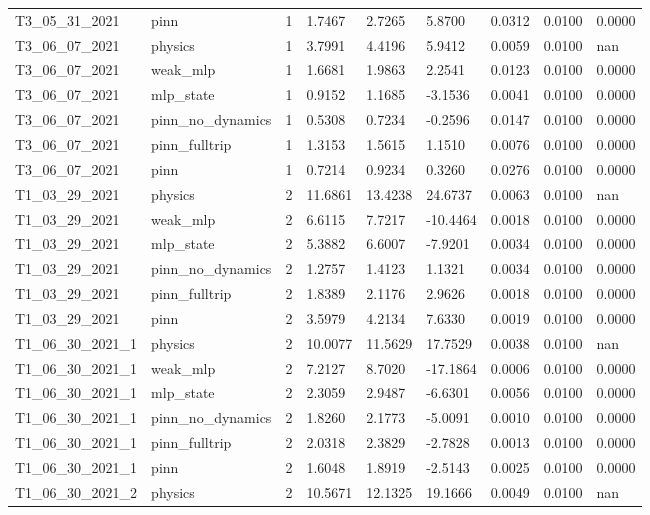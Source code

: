 \begin{table}[t]
\begin{tabular}{lllllllll}
T3\_05\_31\_2021 & pinn & 1 & 1.7467 & 2.7265 & 5.8700 & 0.0312 & 0.0100 & 0.0000 \\
T3\_06\_07\_2021 & physics & 1 & 3.7991 & 4.4196 & 5.9412 & 0.0059 & 0.0100 & nan \\
T3\_06\_07\_2021 & weak\_mlp & 1 & 1.6681 & 1.9863 & 2.2541 & 0.0123 & 0.0100 & 0.0000 \\
T3\_06\_07\_2021 & mlp\_state & 1 & 0.9152 & 1.1685 & -3.1536 & 0.0041 & 0.0100 & 0.0000 \\
T3\_06\_07\_2021 & pinn\_no\_dynamics & 1 & 0.5308 & 0.7234 & -0.2596 & 0.0147 & 0.0100 & 0.0000 \\
T3\_06\_07\_2021 & pinn\_fulltrip & 1 & 1.3153 & 1.5615 & 1.1510 & 0.0076 & 0.0100 & 0.0000 \\
T3\_06\_07\_2021 & pinn & 1 & 0.7214 & 0.9234 & 0.3260 & 0.0276 & 0.0100 & 0.0000 \\
T1\_03\_29\_2021 & physics & 2 & 11.6861 & 13.4238 & 24.6737 & 0.0063 & 0.0100 & nan \\
T1\_03\_29\_2021 & weak\_mlp & 2 & 6.6115 & 7.7217 & -10.4464 & 0.0018 & 0.0100 & 0.0000 \\
T1\_03\_29\_2021 & mlp\_state & 2 & 5.3882 & 6.6007 & -7.9201 & 0.0034 & 0.0100 & 0.0000 \\
T1\_03\_29\_2021 & pinn\_no\_dynamics & 2 & 1.2757 & 1.4123 & 1.1321 & 0.0034 & 0.0100 & 0.0000 \\
T1\_03\_29\_2021 & pinn\_fulltrip & 2 & 1.8389 & 2.1176 & 2.9626 & 0.0018 & 0.0100 & 0.0000 \\
T1\_03\_29\_2021 & pinn & 2 & 3.5979 & 4.2134 & 7.6330 & 0.0019 & 0.0100 & 0.0000 \\
T1\_06\_30\_2021\_1 & physics & 2 & 10.0077 & 11.5629 & 17.7529 & 0.0038 & 0.0100 & nan \\
T1\_06\_30\_2021\_1 & weak\_mlp & 2 & 7.2127 & 8.7020 & -17.1864 & 0.0006 & 0.0100 & 0.0000 \\
T1\_06\_30\_2021\_1 & mlp\_state & 2 & 2.3059 & 2.9487 & -6.6301 & 0.0056 & 0.0100 & 0.0000 \\
T1\_06\_30\_2021\_1 & pinn\_no\_dynamics & 2 & 1.8260 & 2.1773 & -5.0091 & 0.0010 & 0.0100 & 0.0000 \\
T1\_06\_30\_2021\_1 & pinn\_fulltrip & 2 & 2.0318 & 2.3829 & -2.7828 & 0.0013 & 0.0100 & 0.0000 \\
T1\_06\_30\_2021\_1 & pinn & 2 & 1.6048 & 1.8919 & -2.5143 & 0.0025 & 0.0100 & 0.0000 \\
T1\_06\_30\_2021\_2 & physics & 2 & 10.5671 & 12.1325 & 19.1666 & 0.0049 & 0.0100 & nan \\

\end{tabular}
\end{table}
